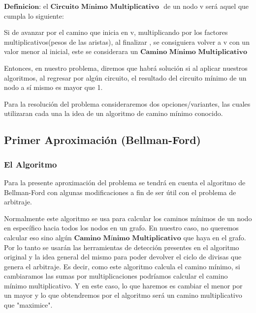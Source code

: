 \documentclass[11pt,a4paper]{article}
\begin{document}
{\large $\textbf{Definicion:}$} el $\textbf{Circuito M\'inimo Multiplicativo }$ de un nodo v ser\'a aquel que cumpla lo siguiente:

Si de avanzar por el camino que inicia en v, multiplicando por los factores multiplicativos(pesos de las aristas), al finalizar , se consiguiera volver a v con un valor menor al inicial, este se considerara un $\textbf{Camino M\'inimo Multiplicativo }$


Entonces, en nuestro problema, diremos que habr\'a soluci\'on si al aplicar nuestros algoritmos, al regresar por alg\'un circuito, el resultado del circuito m\'inimo de un nodo a s\'i mismo es mayor que 1.

Para la resoluci\'on del problema consideraremos dos opciones/variantes, las cuales utilizaran cada una la idea de un algoritmo de camino m\'inimo conocido.

\subsection{Primer Aproximaci\'on (Bellman-Ford)}
\subsubsection{El Algoritmo}

Para la presente aproximaci\'on del problema se tendr\'a en cuenta el algoritmo de Bellman-Ford con algunas modificaciones a fin de ser \'util con el problema de arbitraje.

    Normalmente este algoritmo se usa para calcular los caminos m\'inimos de un nodo en espec\'ifico hacia todos los nodos en un grafo. En nuestro caso, no queremos calcular eso sino alg\'un $\textbf{Camino M\'inimo Multiplicativo}$ que haya en el grafo. Por lo tanto se usar\'an las herramientas de detecci\'on presentes en el algoritmo original y la idea general del mismo para poder devolver el ciclo de divisas que genera el arbitraje. Es decir, como este algoritmo calcula el camino m\'inimo, si cambiaramos las sumas por multiplicaciones podr\'iamos calcular el camino m\'inimo multiplicativo. Y en este caso, lo que haremos es cambiar el menor por un mayor y lo que obtendremos por el algoritmo ser\'a un camino multiplicativo que "maximice".
\end{document}
